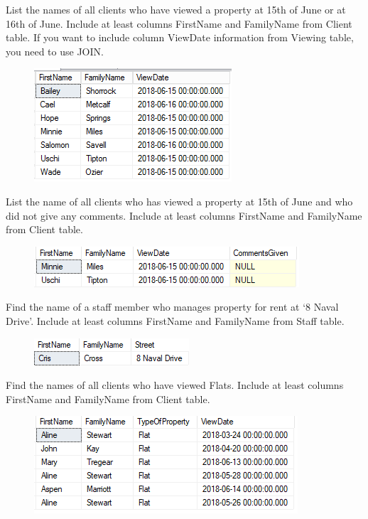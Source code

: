\documentclass[12pt,a4paper]{article}
\begin{document}
\begin{itemize}
\begin{figure}[hbtp]
	\end{figure}
List the names of all clients who have viewed a property at 15th of June or
at 16th of June. Include at least columns FirstName and FamilyName from
Client table. If you want to include column ViewDate information from Viewing
table, you need to use JOIN.
\begin{figure}[hbtp]
	\includegraphics[scale=1]{5-2viewdate.PNG}
	\end{figure}
List the name of all clients who has viewed a property at 15th of June and
who did not give any comments. Include at least columns FirstName and
FamilyName from Client table.
\begin{figure}[hbtp]
	\includegraphics[scale=1]{6-null-comment.PNG}
	\end{figure}
Find the name of a staff member who manages property for rent at ‘8
Naval Drive’. Include at least columns FirstName and FamilyName from Staff
table.
\begin{figure}[hbtp]
	\includegraphics[scale=1]{7-staff-street.PNG}
	\end{figure}
Find the names of all clients who have viewed Flats. Include at least
columns FirstName and FamilyName from Client table. 
\begin{figure}[hbtp]
	\includegraphics[scale=1]{8-view-flat.PNG}
	\end{figure}
\end{itemize}	
\end{document}
